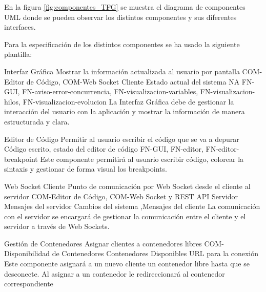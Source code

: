 En la figura \ref{fig:componentes_TFG} se muestra el diagrama de componentes UML \cite{Cook2017} donde se pueden observar los distintos componentes y sus diferentes interfaces.


Para la especificación de los distintos componentes se ha usado la siguiente plantilla: 

\printcomptemplate
\begin{component}{Interfaz Gráfica}
{Mostrar la información actualizada al usuario por pantalla}
{COM-Editor de Código, COM-Web Socket Cliente} %
{Estado actual del sistema} %
{NA} %
{FN-GUI, FN-aviso-error-concurrencia, FN-visualizacion-variables, FN-visualizacion-hilos, FN-visualizacion-evolucion} %
La Interfaz Gráfica debe de gestionar la interacción del usuario con la aplicación y mostrar la información de manera estructurada y clara. %
\end{component}

\begin{component}{Editor de Código}
    {Permitir al usuario escribir el código que se va a depurar}
    {\NA} %
    {\NA} %
    {Código escrito, estado del editor de código} %
    {FN-GUI, FN-editor, FN-editor-breakpoint} %
    Este componente permitirá al usuario escribir código, colorear la sintaxis y gestionar de forma visual los breakpoints. %
\end{component}

\begin{component}{Web Socket Cliente}
{Punto de comunicación por Web Socket desde el cliente al servidor}
{COM-Editor de Código, COM-Web Socket y REST API Servidor} %
{Mensajes del servidor} %
{Cambios del sistema ,Mensajes del cliente} %
{} %
La comunicación con el servidor se encargará de gestionar la comunicación entre el cliente y el servidor a través de Web Sockets. %
\end{component}


\begin{component}{Gestión de Contenedores}
{Asignar clientes a contenedores libres}
{COM-Disponibilidad de Contenedores} %
{Contenedores Disponibles} %
{URL para la conexión} %
{} %
Este componente asignará a un nuevo cliente un contenedor libre hasta que se desconecte. Al asignar a un contenedor le redireccionará al contenedor correspondiente %
\end{component}

